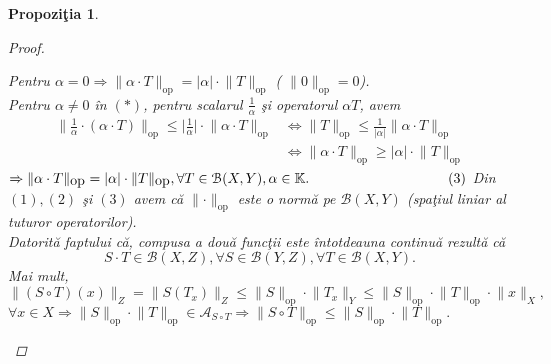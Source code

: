 \documentclass[ a4paper, 12pt]{report}
\newtheorem{prop}[theorem]{\bf Propozi\c tia }
\theoremstyle{remark}
\numberwithin{equation}{section}
\begin{document}
\begin{prop}
\begin{proof}
\begin{enumerate}[(a)]
Pentru $\alpha = 0 \Rightarrow \lVert  \alpha \cdot T \rVert_{\mbox{op}} = \lvert \alpha \rvert \cdot \lVert T \rVert_{\mbox{op}}$ ( $\lVert 0 \rVert_{\mbox{op}} = 0$).\\
Pentru $\alpha \neq 0$ \^in $(\ast)$, pentru scalarul $\frac{1}{\alpha}$ \c si operatorul $\alpha T$, avem
\begin{align*}
\lVert \frac{1}{\alpha} \cdot (\alpha \cdot T) \rVert_{\mbox{op}} \leq \lvert  \frac{1}{\alpha} \rvert \cdot \lVert \alpha \cdot T \rVert_{\mbox{op}} &\Leftrightarrow
\lVert T \rVert_{\mbox{op}} \leq \frac{1}{\lvert \alpha \rvert} \lVert \alpha \cdot T \rVert_{\mbox{op}}\\
&\Leftrightarrow \lVert \alpha \cdot T \rVert_{\mbox{op}} \geq \lvert \alpha \rvert \cdot \lVert T \rVert_{\mbox{op}}
\end{align*}
$\Rightarrow \lVert \alpha \cdot T \rVert_{\mbox{op}} = \lvert \alpha \rvert \cdot \lVert T \rVert_{\mbox{op}}, \forall T \in \mathcal{B}(X,Y), \alpha \in \mathbb{K}. \hspace{35mm}(3) $
Din $(1),(2)$ \c si $(3)$ avem c\u a $\lVert \cdot  \rVert_{\mbox{op}}$ este o norm\u a pe $\mathcal{B}(X,Y)$ (spa\c tiul liniar al tuturor operatorilor).\\
Datorit\u a faptului c\u a, compusa a dou\u a func\c tii este \^intotdeauna continu\u a rezult\u a c\u a
\[ S \cdot T \in \mathcal{B}(X,Z), \forall S \in \mathcal{B}(Y,Z), \forall T \in \mathcal{B}(X,Y).\]
Mai mult,
\[ \lVert (S \circ T)(x) \rVert_{Z} = \lVert S(T_x)  \rVert_{Z} \leq \lVert S \rVert_{\mbox{op}} \cdot \lVert T_x \rVert_{Y} \leq \lVert S \rVert_{\mbox{op}} \cdot \lVert T \rVert_{\mbox{op}} \cdot \lVert x \rVert_{X} ,\] $\forall x \in X \Rightarrow \lVert S \rVert_{\mbox{op}} \cdot \lVert T \rVert_{\mbox{op}} \in \mathcal{A}_{S \circ T} \Rightarrow \lVert S \circ T \rVert_{\mbox{op}} \leq \lVert S \rVert_{\mbox{op}} \cdot \lVert T \rVert_{\mbox{op}}.$
\end{enumerate}
\end{proof}
\end{prop}
\end{document}
